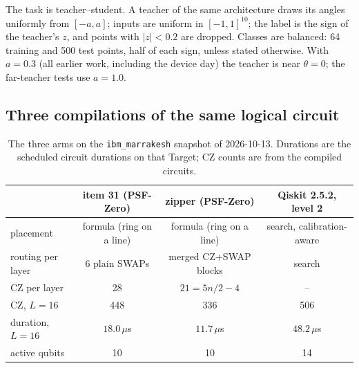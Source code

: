\documentclass[11pt]{article}
\begin{document}
The task is teacher--student. A teacher of the same architecture draws its angles uniformly from $[-a, a]$; inputs
are uniform in $[-1,1]^{10}$; the label is the sign of the teacher's $z$, and points with $|z| < 0.2$ are dropped.
Classes are balanced: 64 training and 500 test points, half of each sign, unless stated otherwise. With $a = 0.3$ (all earlier work, including
the device day) the teacher is near $\theta = 0$; the far-teacher tests use $a = 1.0$.

\subsection{Three compilations of the same logical circuit}

\begin{table}[h]
\centering
\small
\begin{tabular}{lccc}
\toprule
 & item 31 (PSF-Zero) & zipper (PSF-Zero) & Qiskit 2.5.2, level 2 \\
\midrule
placement & formula (ring on a line) & formula (ring on a line) & search, calibration-aware \\
routing per layer & 6 plain SWAPs & merged CZ+SWAP blocks & search \\
CZ per layer & 28 & $21 = 5n/2 - 4$ & -- \\
CZ, $L = 16$ & 448 & 336 & 506 \\
duration, $L = 16$ & $18.0\,\mu$s & $11.7\,\mu$s & $48.2\,\mu$s \\
active qubits & 10 & 10 & 14 \\
\bottomrule
\end{tabular}
\caption{The three arms on the \texttt{ibm\_marrakesh} snapshot of 2026-10-13. Durations are the scheduled circuit
durations on that Target; CZ counts are from the compiled circuits.}
\label{tab:arms}
\end{table}
\end{document}

